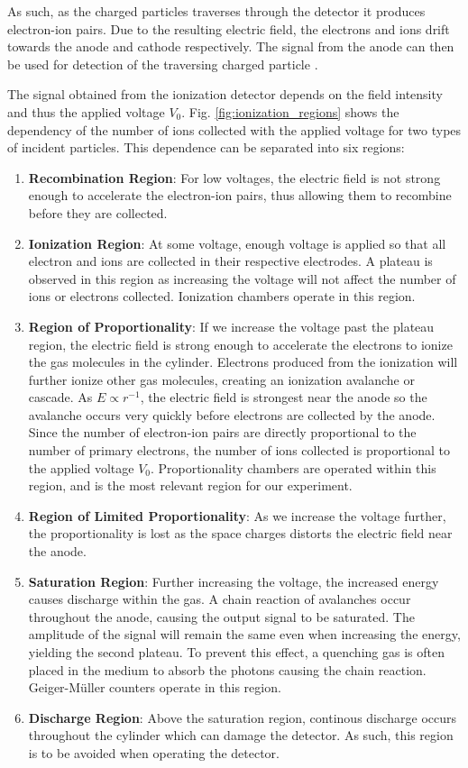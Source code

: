 \documentclass[a4paper]{report}
\numberwithin{equation}{section}
\begin{document}
As such, as the charged particles traverses through the detector it produces electron-ion pairs. Due to the resulting electric field, 
the electrons and ions drift towards the anode and cathode respectively. The signal from the anode can then be used for detection of the 
traversing charged particle \cite{Leo1994}. \par 

The signal obtained from the ionization detector depends on the field intensity and thus the applied voltage $V_0$. Fig. \ref{fig:ionization_regions} shows the 
dependency of the number of ions collected with the applied voltage for two types of incident particles. This dependence can be separated into six regions:
\begin{enumerate}
	\item \textbf{Recombination Region}: For low voltages, the electric field is not strong enough to accelerate the electron-ion pairs, thus allowing them to recombine 
			before they are collected.
	\item \textbf{Ionization Region}: At some voltage, enough voltage is applied so that all electron and ions are collected in their respective electrodes. 
			A plateau is observed in this region as increasing the voltage will not affect the number of ions or electrons collected. Ionization chambers operate in this region.
	\item \textbf{Region of Proportionality}: If we increase the voltage past the plateau region, the electric field is strong enough to accelerate the electrons to ionize the gas molecules 
			in the cylinder. Electrons produced from the ionization will further ionize other gas molecules, creating an ionization avalanche or cascade. As $E \propto r^{-1}$,
			the electric field is strongest near the anode so the avalanche occurs very quickly before electrons are collected by the anode. Since the number of electron-ion
			pairs are directly proportional to the number of primary electrons, the number of ions collected is proportional to the applied voltage $V_0$. Proportionality
			chambers are operated within this region, and is the most relevant region for our experiment.
	\item \textbf{Region of Limited Proportionality}: As we increase the voltage further, the proportionality is lost as the space charges distorts the electric field
			near the anode. 
	\item \textbf{Saturation Region}: Further increasing the voltage, the increased energy causes discharge within the gas. A chain reaction of avalanches occur 
			throughout the anode, causing the output signal to be saturated. The amplitude of the signal will remain the same even when increasing the energy, 
			yielding the second plateau. To prevent this effect, a quenching gas is often placed in the medium to absorb the photons causing the chain reaction. 
			Geiger-M{\"u}ller counters operate in this region.
	\item \textbf{Discharge Region}: Above the saturation region, continous discharge occurs throughout the cylinder which can damage the detector. As such, this region
			is to be avoided when operating the detector.
\end{enumerate}
\end{document}
